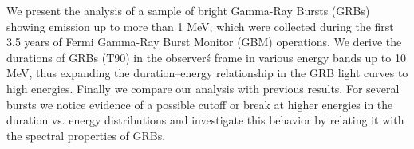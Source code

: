 


\bigskip



\bigskip

\noindent We present the analysis of a sample of bright Gamma-Ray Bursts (GRBs) showing emission up to more than 1 MeV, which were collected during the first 3.5 years of Fermi Gamma-Ray Burst Monitor (GBM) operations.
We derive the durations of GRBs (T90) in the observer\'s frame in various energy bands up to 10 MeV, thus expanding the duration–energy relationship in the GRB light curves to high energies. Finally we compare our analysis with previous results.
For several bursts we notice evidence of a possible cutoff or break at higher energies in the duration vs. energy distributions and investigate this
behavior by relating it with the spectral properties of GRBs.
